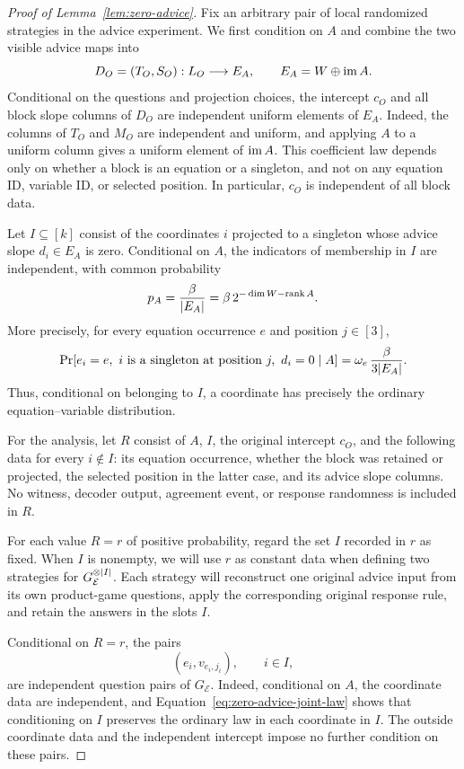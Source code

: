 \begin{proof}[Proof of Lemma~\ref{lem:zero-advice}]
Fix an arbitrary pair of local randomized strategies in the advice
experiment.  We first condition on $A$ and combine the two visible
advice maps into
\[
 D_O=(T_O,S_O):L_O\longrightarrow E_A,
 \qquad E_A=W\oplus\operatorname{im} A.
\]
Conditional on the questions and projection choices, the intercept
$c_O$ and all block slope columns of $D_O$ are independent uniform
elements of $E_A$.  Indeed, the columns of $T_O$ and $M_O$ are
independent and uniform, and applying $A$ to a uniform column gives a
uniform element of $\operatorname{im} A$.  This coefficient law depends only on
whether a block is an equation or a singleton, and not on any equation
ID, variable ID, or selected position.  In particular, $c_O$ is
independent of all block data.

Let $I\subseteq[k]$ consist of the coordinates $i$ projected to a singleton
whose advice slope $d_i\in E_A$ is zero.  Conditional on $A$,
the indicators of membership in $I$ are independent, with common probability
\begin{equation}
 p_A=\frac{\beta}{\lvert E_A\rvert}
     =\beta\,2^{-\dim W-\operatorname{rank} A}.
 \label{eq:zero-advice-probability}
\end{equation}
More precisely, for every equation occurrence $e$ and position
$j\in[3]$,
\begin{equation}
 \Pr[e_i=e,\ i\text{ is a singleton at position }j,\ d_i=0\mid A]
 =\omega_e\,\frac{\beta}{3\lvert E_A\rvert}.
 \label{eq:zero-advice-joint-law}
\end{equation}
Thus, conditional on belonging to $I$, a coordinate has precisely the
ordinary equation--variable distribution.

For the analysis, let $R$ consist
of $A$, $I$, the original intercept $c_O$, and the following data for
every $i\notin I$: its equation occurrence, whether the block was
retained or projected, the selected position in the latter case, and
its advice slope columns.  No witness, decoder output, agreement event,
or response randomness is included in $R$.

For each value $R=r$ of positive probability, regard the set
$I$ recorded in $r$ as fixed.  When $I$ is nonempty, we will use $r$
as constant data when defining two strategies for
$G_{\mathcal E}^{\otimes\lvert I\rvert}$.
Each strategy will reconstruct one original advice input from its own
product-game questions, apply the corresponding original response rule,
and retain the answers in the slots $I$.

Conditional on $R=r$, the pairs
\[
 (e_i,v_{e_i,j_i}),\qquad i\in I,
\]
are independent question pairs of $G_{\mathcal E}$.  Indeed, conditional
on $A$, the coordinate data are independent, and
Equation~\eqref{eq:zero-advice-joint-law} shows that conditioning on $I$
preserves the ordinary law in each coordinate in $I$.  The outside
coordinate data and the independent intercept impose no further
condition on these pairs.


\end{proof}
